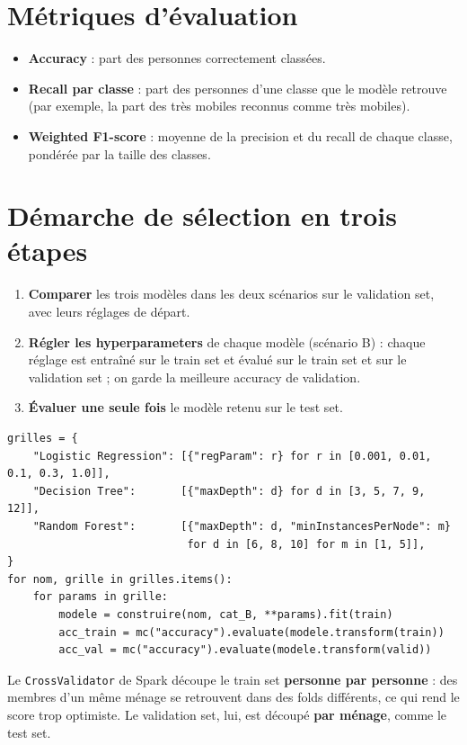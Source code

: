 \documentclass[12pt,a4paper]{report}
\newcommand{\code}[1]{\texttt{\small #1}}
\newcommand{\1}{\mathbf{1}}
\begin{document}
\section{Métriques d'évaluation}
\begin{itemize}[leftmargin=*]
  \item \textbf{Accuracy} : part des personnes correctement classées.
  \item \textbf{Recall par classe} : part des personnes d'une classe que le modèle retrouve (par exemple, la part des très mobiles reconnus comme très mobiles).
  \item \textbf{Weighted F1-score} : moyenne de la precision et du recall de chaque classe, pondérée par la taille des classes.
\end{itemize}

\section{Démarche de sélection en trois étapes}
\begin{enumerate}[leftmargin=*]
  \item \textbf{Comparer} les trois modèles dans les deux scénarios sur le validation set, avec leurs réglages de départ.
  \item \textbf{Régler les hyperparameters} de chaque modèle (scénario B) : chaque réglage est entraîné sur le train set et évalué sur le train set et sur le validation set ; on garde la meilleure accuracy de validation.
  \item \textbf{Évaluer une seule fois} le modèle retenu sur le test set.
\end{enumerate}

\begin{lstlisting}[caption={Réglage des hyperparameters sur le validation set},label={lst:reglage}]
grilles = {
    "Logistic Regression": [{"regParam": r} for r in [0.001, 0.01, 0.1, 0.3, 1.0]],
    "Decision Tree":       [{"maxDepth": d} for d in [3, 5, 7, 9, 12]],
    "Random Forest":       [{"maxDepth": d, "minInstancesPerNode": m}
                            for d in [6, 8, 10] for m in [1, 5]],
}
for nom, grille in grilles.items():
    for params in grille:
        modele = construire(nom, cat_B, **params).fit(train)
        acc_train = mc("accuracy").evaluate(modele.transform(train))
        acc_val = mc("accuracy").evaluate(modele.transform(valid))
\end{lstlisting}

\begin{attention}
Le \code{CrossValidator} de Spark découpe le train set \textbf{personne par personne} : des membres d'un même ménage se retrouvent dans des folds différents, ce qui rend le score trop optimiste. Le validation set, lui, est découpé \textbf{par ménage}, comme le test set.
\end{attention}
\end{document}
